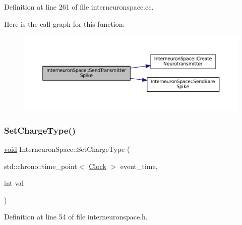 Definition at line 261 of file interneuronspace.\+cc.

Here is the call graph for this function\+:\nopagebreak
\begin{figure}[H]
\begin{center}
\leavevmode
\includegraphics[width=350pt]{class_interneuron_space_a0a24da715aecafd4072d596fc271666f_cgraph}
\end{center}
\end{figure}
\mbox{\label{class_interneuron_space_a404aacb1adce30288bb7b4237344e4cc}} 
\subsubsection{\texorpdfstring{Set\+Charge\+Type()}{SetChargeType()}}
{\footnotesize\ttfamily \mbox{\hyperlink{glad_8h_a950fc91edb4504f62f1c577bf4727c29}{void}} Interneuron\+Space\+::\+Set\+Charge\+Type (\begin{DoxyParamCaption}\item[{std\+::chrono\+::time\+\_\+point$<$ \mbox{\hyperlink{universe_8h_a0ef8d951d1ca5ab3cfaf7ab4c7a6fd80}{Clock}} $>$}]{event\+\_\+time,  }\item[{int}]{val }\end{DoxyParamCaption})\hspace{0.3cm}{\ttfamily [inline]}}



Definition at line 54 of file interneuronspace.\+h.

\mbox{\label{class_interneuron_space_a60a46f22a2e575d65031635a698a60a9}} 
